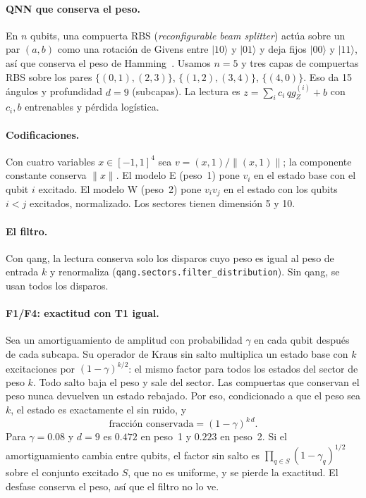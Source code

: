 \documentclass[11pt]{article}
\newcommand{\qZ}{qg_Z}
\begin{document}
\paragraph{QNN que conserva el peso.} En $n$ qubits, una compuerta RBS (\emph{reconfigurable beam splitter})
actúa sobre un par $(a,b)$ como una rotación de Givens entre $|10\rangle$ y $|01\rangle$ y deja fijos
$|00\rangle$ y $|11\rangle$, así que conserva el peso de Hamming~\cite{landman2022}. Usamos $n=5$ y tres capas
de compuertas RBS sobre los pares $\{(0,1),(2,3)\}$, $\{(1,2),(3,4)\}$, $\{(4,0)\}$. Eso da 15 ángulos y
profundidad $d=9$ (subcapas). La lectura es $z=\sum_i c_i\,\qZ^{(i)}+b$ con $c_i,b$ entrenables y pérdida
logística.

\paragraph{Codificaciones.} Con cuatro variables $x\in[-1,1]^4$ sea $v=(x,1)/\|(x,1)\|$; la componente
constante conserva $\|x\|$. El modelo E (peso~1) pone $v_i$ en el estado base con el qubit $i$ excitado. El
modelo W (peso~2) pone $v_iv_j$ en el estado con los qubits $i<j$ excitados, normalizado. Los sectores tienen
dimensión 5 y 10.

\paragraph{El filtro.} Con qang, la lectura conserva solo los disparos cuyo peso es igual al peso de entrada
$k$ y renormaliza (\texttt{qang.sectors.filter\_distribution}). Sin qang, se usan todos los disparos.

\paragraph{F1/F4: exactitud con T1 igual.} Sea un amortiguamiento de amplitud con probabilidad $\gamma$ en cada
qubit después de cada subcapa. Su operador de Kraus sin salto multiplica un estado base con $k$ excitaciones por
$(1-\gamma)^{k/2}$: el mismo factor para todos los estados del sector de peso $k$. Todo salto baja el peso y sale
del sector. Las compuertas que conservan el peso nunca devuelven un estado rebajado. Por eso, condicionado a que
el peso sea $k$, el estado es exactamente el sin ruido, y
\begin{equation}
  \text{fracción conservada}=(1-\gamma)^{k\,d}.
\end{equation}
Para $\gamma=0.08$ y $d=9$ es $0.472$ en peso~1 y $0.223$ en peso~2. Si el amortiguamiento cambia entre qubits,
el factor sin salto es $\prod_{q\in S}(1-\gamma_q)^{1/2}$ sobre el conjunto excitado $S$, que no es uniforme, y se
pierde la exactitud. El desfase conserva el peso, así que el filtro no lo ve.
\end{document}
